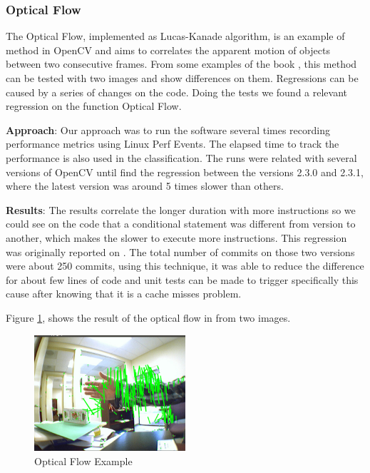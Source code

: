 \subsubsection{Optical Flow} 
The Optical Flow, implemented as Lucas-Kanade algorithm, is an example of method in OpenCV and aims to correlates the apparent motion of objects between two consecutive frames. From some examples of the book \cite{opencv2_book}, this method can be tested with two images and show differences on them. Regressions can be caused by a series of changes on the code. Doing the tests we found a relevant regression on the function Optical Flow.

\textbf{Approach}: Our approach was to run the software several times recording performance metrics using Linux Perf Events. The elapsed time to track the performance is also used in the classification. The runs were related with several versions of OpenCV until find the regression between the versions 2.3.0 and 2.3.1, where the latest version was around 5 times slower than others.

\textbf{Results}: The results correlate the longer duration with more instructions so we could see on the code that a conditional statement was different from version to another, which makes the slower to execute more instructions. This regression was originally reported on \cite{regression_opencv}.
The total number of commits on those two versions were about 250 commits, using this technique, it was able to reduce the difference for about few lines of code and unit tests can be made to trigger specifically this cause after knowing that it is a cache misses problem.

Figure \ref{fig:OpenCV}, shows the result of the optical flow in from two images.
    
\begin{figure}[h]
      \centering
        \includegraphics[width=0.50\textwidth]{figures/flow.png}
        \caption{Optical Flow Example}
        \label{fig:OpenCV}
\end{figure}

